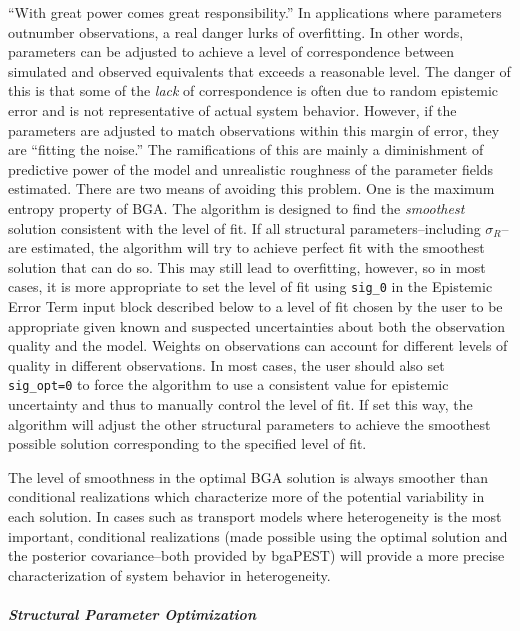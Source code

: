 \documentclass[11pt,oneside,onecolumn]{usgsreport}
\begin{document}
\begin{multicols}{2}
\begin{bibunit}
``With great power comes great responsibility.'' In applications
where parameters outnumber observations, a real danger lurks of overfitting.
In other words, parameters can be adjusted to achieve a level of correspondence
between simulated and observed equivalents that exceeds a reasonable
level. The danger of this is that some of the \emph{lack} of correspondence
is often due to random epistemic error and is not representative of
actual system behavior. However, if the parameters are adjusted to
match observations within this margin of error, they are ``fitting
the noise.'' The ramifications of this are mainly a diminishment
of predictive power of the model and unrealistic roughness of the
parameter fields estimated. There are two means of avoiding this problem.
One is the maximum entropy property of BGA. The algorithm is designed
to find the \emph{smoothest} solution consistent with the level of
fit. If all structural parameters--including $\sigma_{R}$--are estimated,
the algorithm will try to achieve perfect fit with the smoothest solution
that can do so. This may still lead to overfitting, however, so in
most cases, it is more appropriate to set the level of fit using \texttt{sig\_0}
in the Epistemic Error Term input block described below to a level
of fit chosen by the user to be appropriate given known and suspected
uncertainties about both the observation quality and the model. Weights
on observations can account for different levels of quality in different
observations. In most cases, the user should also set \texttt{sig\_opt=0}
to force the algorithm to use a consistent value for epistemic uncertainty
and thus to manually control the level of fit. If set this way, the
algorithm will adjust the other structural parameters to achieve the
smoothest possible solution corresponding to the specified level of
fit. 

The level of smoothness in the optimal BGA solution is always smoother
than conditional realizations \citep{Kitanidis1995} which characterize
more of the potential variability in each solution. In cases such
as transport models where heterogeneity is the most important, conditional
realizations (made possible using the optimal solution and the posterior
covariance--both provided by bgaPEST) will provide a more precise
characterization of system behavior in heterogeneity.


\subparagraph*{Structural Parameter Optimization}


\end{bibunit}
\end{multicols}
\end{document}
